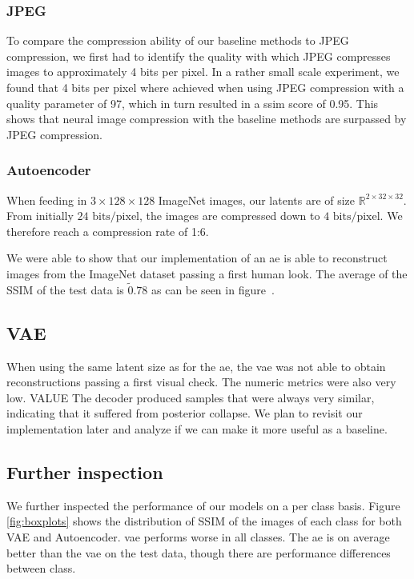\subsubsection{JPEG}\label{subsubsec:jpeg}
To compare the compression ability of our baseline methods to JPEG compression, we first had to identify the quality with which JPEG compresses images to approximately 4 bits per pixel.
In a rather small scale experiment, we found that 4 bits per pixel where achieved when using JPEG compression with a quality parameter of 97, which in turn resulted in a \ac{ssim} score of 0.95.
This shows that neural image compression with the baseline methods are surpassed by JPEG compression. 

\subsubsection{Autoencoder}\label{subsubsec:autoencoder}
When feeding in $3 \times 128 \times 128$ ImageNet images, our latents are of size $\mathbb{R}^{2\times 32 \times 32}$.
From initially $24\text{ bits/pixel}$, the images are compressed down to $4\text{ bits/pixel}$.
We therefore reach a compression rate of 1:6.

We were able to show that our implementation of an \ac{ae} is able to reconstruct images from the ImageNet dataset
passing a first human look.
The average of the SSIM of the test data is $\tilde0.78$ as can be seen in figure~\cite{citationNeeded}.

\subsection{VAE}
When using the same latent size as for the \ac{ae}, the \ac{vae} was not able to obtain reconstructions
passing a first visual check.
The numeric metrics were also very low. VALUE
The decoder produced samples that were always very similar, indicating that it suffered from posterior collapse.
We plan to revisit our implementation later and analyze if we can make it more useful as a baseline.

\subsection{Further inspection}
We further inspected the performance of our models on a per class basis. Figure \ref{fig:boxplots} shows the distribution of SSIM of the images of each class for both VAE and Autoencoder. \ac{vae} performs worse in all classes. The \ac{ae} is on average better than the \ac{vae} on the test data, though there are performance differences between class. 

